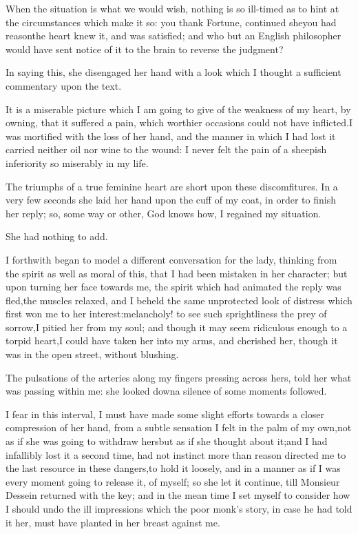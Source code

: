 \documentclass[twoside]{article}
\begin{document}
When the situation is what we would wish, nothing is so ill-timed as to
hint at the circumstances which make it so: you thank Fortune, continued
she\tsk you had reason\tsk the heart knew it, and was satisfied; and who but an
English philosopher would have sent notice of it to the brain to reverse
the judgment?

In saying this, she disengaged her hand with a look which I thought a
sufficient commentary upon the text.

It is a miserable picture which I am going to give of the weakness of my
heart, by owning, that it suffered a pain, which worthier occasions could
not have inflicted.\tsk I was mortified with the loss of her hand, and the
manner in which I had lost it carried neither oil nor wine to the wound:
I never felt the pain of a sheepish inferiority so miserably in my life.

The triumphs of a true feminine heart are short upon these discomfitures.
In a very few seconds she laid her hand upon the cuff of my coat, in
order to finish her reply; so, some way or other, God knows how, I
regained my situation.

\tsk She had nothing to add.

I forthwith began to model a different conversation for the lady,
thinking from the spirit as well as moral of this, that I had been
mistaken in her character; but upon turning her face towards me, the
spirit which had animated the reply was fled,\tsk the muscles relaxed, and I
beheld the same unprotected look of distress which first won me to her
interest:\tsk melancholy! to see such sprightliness the prey of sorrow,\tsk I
pitied her from my soul; and though it may seem ridiculous enough to a
torpid heart,\tsk I could have taken her into my arms, and cherished her,
though it was in the open street, without blushing.

The pulsations of the arteries along my fingers pressing across hers,
told her what was passing within me: she looked down\tsk a silence of some
moments followed.

I fear in this interval, I must have made some slight efforts towards a
closer compression of her hand, from a subtle sensation I felt in the
palm of my own,\tsk not as if she was going to withdraw hers\tsk but as if she
thought about it;\tsk and I had infallibly lost it a second time, had not
instinct more than reason directed me to the last resource in these
dangers,\tsk to hold it loosely, and in a manner as if I was every moment
going to release it, of myself; so she let it continue, till Monsieur
Dessein returned with the key; and in the mean time I set myself to
consider how I should undo the ill impressions which the poor monk’s
story, in case he had told it her, must have planted in her breast
against me.
\end{document}
